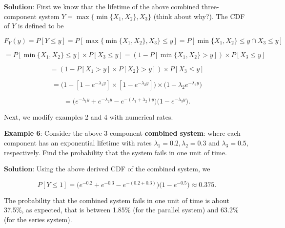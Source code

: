 \documentclass[
]{book}
\begin{document}
\textbf{Solution}: First we know that the lifetime of the above combined three-component system \(Y= \max \{ \min\{X_1, X_2 \}, X_3 \}\) (think about why?). The CDF of \(Y\) is defined to be

\[
F_Y(y) = P[Y \le y] = P[\max \{ \min\{X_1, X_2 \}, X_3 \}  \le y] = P[ \min\{X_1, X_2 \} \le y \cap X_3 \le y]
\]

\[
= P[ \min\{X_1, X_2 \} \le y] \times P[ X_3 \le y] = \left( 1 - P[\min\{X_1, X_2 \} > y] \right) \times P[ X_3 \le y]
\]

\[
= \left( 1 - P[X_1 >y]\times P[X_2 \} > y] \right) \times P[ X_3 \le y]
\]

\[
=\bigg( 1 - [1-e^{-\lambda_1 y}]\times [1-e^{-\lambda_2 y}] \bigg) \times \bigg( 1-\lambda_2 e^{-\lambda_3 y}\bigg)
\]

\[
=\bigg(e^{-\lambda_1y} + e^{-\lambda_2 y} - e^{-(\lambda_1 + \lambda_2)y} \bigg)\bigg( 1- e^{-\lambda_3 y}\bigg).
\]

Next, we modify examples 2 and 4 with numerical rates.

\textbf{\color{red}Example 6}: Consider the above 3-component \textbf{combined system}: where each component has an exponential lifetime with rates \(\lambda_1 =0.2, \lambda_2 = 0.3\) and \(\lambda_3 =0.5\), respectively. Find the probability that the system fails in one unit of time.

\textbf{Solution}: Using the above derived CDF of the combined system, we

\[
P[Y \le 1] = \bigg(e^{-0.2} + e^{-0.3} - e^{-(0.2 + 0.3)} \bigg)\bigg( 1- e^{-0.5}\bigg) \approx 0.375.
\]

The probability that the combined system fails in one unit of time is about 37.5\%, as expected, that is between 1.85\% (for the parallel system) and 63.2\% (for the series system).

  
\end{document}
